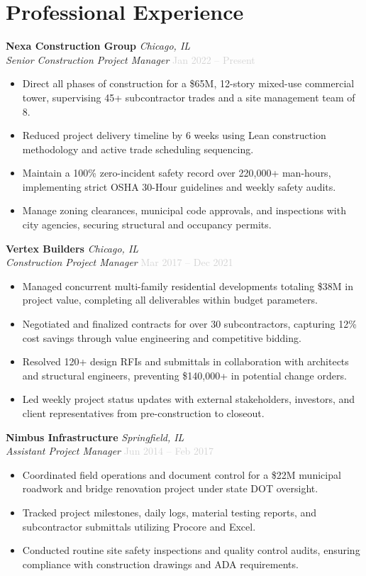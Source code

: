 \documentclass[10pt,letterpaper]{article}
\newcommand{\experienceHeader}[4]{
  \noindent
  \textbf{#1} \hfill \textit{#2} \\
  \textit{#3} \hfill \textcolor{lightgray}{\small #4}
  \vspace{3pt}
}
\begin{document}
\vspace{6pt}

\section*{Professional Experience}

\experienceHeader{Nexa Construction Group}{Chicago, IL}{Senior Construction Project Manager}{Jan 2022 -- Present}
\begin{itemize}
  \item Direct all phases of construction for a \$65M, 12-story mixed-use commercial tower, supervising 45+ subcontractor trades and a site management team of 8.
  \item Reduced project delivery timeline by 6 weeks using Lean construction methodology and active trade scheduling sequencing.
  \item Maintain a 100\% zero-incident safety record over 220,000+ man-hours, implementing strict OSHA 30-Hour guidelines and weekly safety audits.
  \item Manage zoning clearances, municipal code approvals, and inspections with city agencies, securing structural and occupancy permits.
\end{itemize}

\experienceHeader{Vertex Builders}{Chicago, IL}{Construction Project Manager}{Mar 2017 -- Dec 2021}
\begin{itemize}
  \item Managed concurrent multi-family residential developments totaling \$38M in project value, completing all deliverables within budget parameters.
  \item Negotiated and finalized contracts for over 30 subcontractors, capturing 12\% cost savings through value engineering and competitive bidding.
  \item Resolved 120+ design RFIs and submittals in collaboration with architects and structural engineers, preventing \$140,000+ in potential change orders.
  \item Led weekly project status updates with external stakeholders, investors, and client representatives from pre-construction to closeout.
\end{itemize}

\experienceHeader{Nimbus Infrastructure}{Springfield, IL}{Assistant Project Manager}{Jun 2014 -- Feb 2017}
\begin{itemize}
  \item Coordinated field operations and document control for a \$22M municipal roadwork and bridge renovation project under state DOT oversight.
  \item Tracked project milestones, daily logs, material testing reports, and subcontractor submittals utilizing Procore and Excel.
  \item Conducted routine site safety inspections and quality control audits, ensuring compliance with construction drawings and ADA requirements.
\end{itemize}
\end{document}
